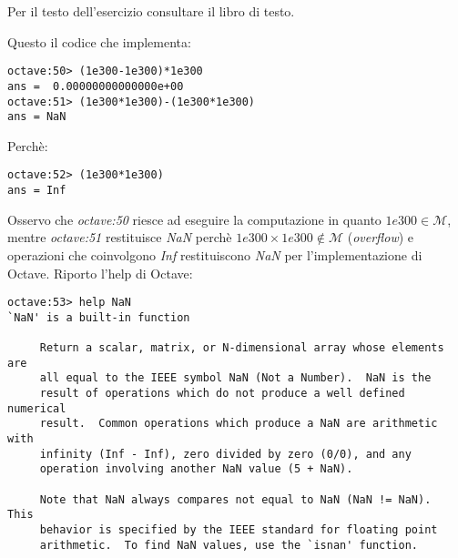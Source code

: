 \begin{exercise}[1.14]
Per il testo dell'esercizio consultare il libro di testo.
\end{exercise}
Questo il codice che implementa:
\begin{lstlisting}
octave:50> (1e300-1e300)*1e300
ans =  0.00000000000000e+00
octave:51> (1e300*1e300)-(1e300*1e300)
ans = NaN
\end{lstlisting}
Perch\`e:
\begin{lstlisting}
octave:52> (1e300*1e300)
ans = Inf
\end{lstlisting}
Osservo che \emph{octave:50} riesce ad eseguire la computazione in quanto $1e300 \in \mathcal{M}$,
mentre \emph{octave:51} restituisce \emph{NaN} perch\`e $1e300\times1e300 \not \in \mathcal{M}$
(\emph{overflow}) e operazioni che coinvolgono \emph{Inf} restituiscono \emph{NaN} 
per l'implementazione di Octave. Riporto l'help di Octave:
\begin{lstlisting}
octave:53> help NaN
`NaN' is a built-in function

     Return a scalar, matrix, or N-dimensional array whose elements are
     all equal to the IEEE symbol NaN (Not a Number).  NaN is the
     result of operations which do not produce a well defined numerical
     result.  Common operations which produce a NaN are arithmetic with
     infinity (Inf - Inf), zero divided by zero (0/0), and any
     operation involving another NaN value (5 + NaN).

     Note that NaN always compares not equal to NaN (NaN != NaN).  This
     behavior is specified by the IEEE standard for floating point
     arithmetic.  To find NaN values, use the `isnan' function.

\end{lstlisting}



























